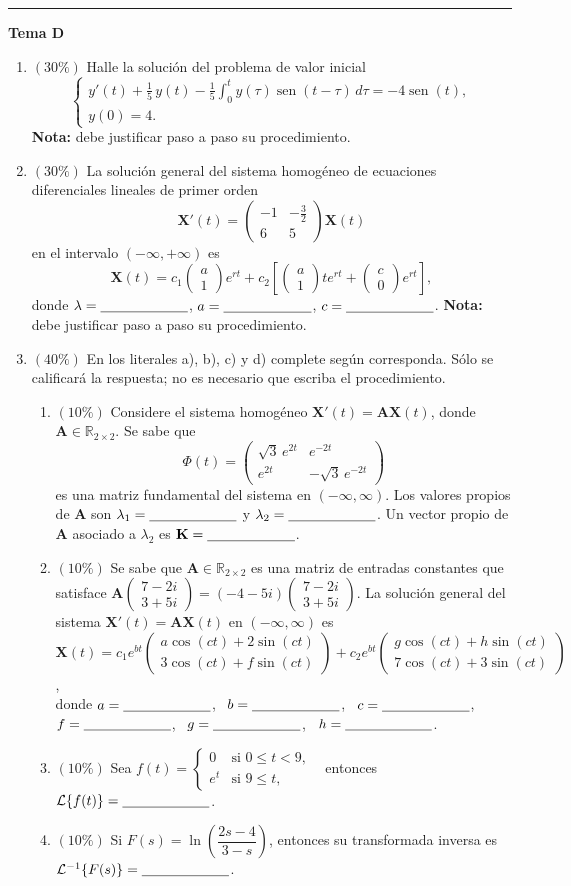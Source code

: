 \documentclass[11pt]{article}
\newcommand{\rp}{\underline{\hspace{2.2cm}}}
\newcommand{\temacuerpo}[8]{%
\begin{enumerate}
\item $(30\%)$ Halle la solución del problema de valor inicial
\[
\begin{cases}
y'(t) + #1\, y(t) - #1 \displaystyle\int_0^t y(\tau)\operatorname{sen}(t - \tau)\,d\tau = #2\operatorname{sen}(t), \\[4pt]
y(0) = #3.
\end{cases}
\]
\textbf{Nota:} debe justificar paso a paso su procedimiento.

\item $(30\%)$ La solución general del sistema homogéneo de ecuaciones diferenciales lineales de primer orden
\[
\mathbf{X}'(t) = #4 \mathbf{X}(t)
\]
en el intervalo $(-\infty, +\infty)$ es
\[
\mathbf{X}(t) = c_1 \begin{pmatrix} a \\ 1 \end{pmatrix} e^{rt}
+ c_2 \left[ \begin{pmatrix} a \\ 1 \end{pmatrix} t e^{rt} + \begin{pmatrix} c \\ 0 \end{pmatrix} e^{rt} \right],
\]
donde $\lambda = \rp$, \quad $a = \rp$, \quad $c = \rp$.
\textbf{Nota:} debe justificar paso a paso su procedimiento.

\item $(40\%)$ En los literales a), b), c) y d) complete según corresponda. Sólo se calificará la respuesta; no es necesario que escriba el procedimiento.
\begin{enumerate}[label=(\alph*)]
\item $(10\%)$ Considere el sistema homogéneo $\mathbf{X}'(t) = \mathbf{A}\mathbf{X}(t)$, donde $\mathbf{A} \in \mathbb{R}_{2\times 2}$. Se sabe que
\[
\Phi(t) = #5
\]
es una matriz fundamental del sistema en $(-\infty, \infty)$. Los valores propios de $\mathbf{A}$ son $\lambda_1 = \rp$ y $\lambda_2 = \rp$. Un vector propio de $\mathbf{A}$ asociado a $\lambda_2$ es $\mathbf{K} = \rp$.
\item $(10\%)$ #6 \\
donde $a = \rp$, \ $b = \rp$, \ $c = \rp$, \ $f = \rp$, \ $g = \rp$, \ $h = \rp$.
\item $(10\%)$ Sea $f(t) = \begin{cases} 0 & \text{si } 0 \leq t < #7, \\ e^t & \text{si } #7 \leq t, \end{cases}$ \ entonces $\mathcal{L}\{f(t)\} = \rp$.
\item $(10\%)$ Si $F(s) = \ln\!\left(#8\right)$, entonces su transformada inversa es $\mathcal{L}^{-1}\{F(s)\} = \rp$.
\end{enumerate}
\end{enumerate}
}
\begin{document}
\bigskip\hrule\medskip
\begin{center}\bfseries\large Tema D\end{center}
\temacuerpo{\tfrac{1}{5}}{-4}{4}%
{\begin{pmatrix} -1 & -\tfrac{3}{2} \\[2pt] 6 & 5 \end{pmatrix}}%
{\begin{pmatrix} \sqrt3\,e^{2t} & e^{-2t} \\[2pt] e^{2t} & -\sqrt3\,e^{-2t} \end{pmatrix}}%
{Se sabe que $\mathbf{A} \in \mathbb{R}_{2\times 2}$ es una matriz de entradas constantes que satisface
$\mathbf{A}\begin{pmatrix} 7-2i \\ 3+5i \end{pmatrix} = (-4-5i)\begin{pmatrix} 7-2i \\ 3+5i \end{pmatrix}$.
La solución general del sistema $\mathbf{X}'(t) = \mathbf{A}\mathbf{X}(t)$ en $(-\infty, \infty)$ es
$\mathbf{X}(t) = c_1 e^{bt}\begin{pmatrix} a\cos(ct) + 2\sin(ct) \\ 3\cos(ct) + f\sin(ct) \end{pmatrix}
+ c_2 e^{bt}\begin{pmatrix} g\cos(ct) + h\sin(ct) \\ 7\cos(ct) + 3\sin(ct) \end{pmatrix}$,}%
{9}{\dfrac{2s-4}{3-s}}

\vfill
{}
\end{document}
